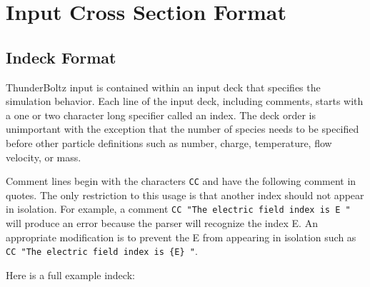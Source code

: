 \documentclass[letterpaper,10pt,english,openany,oneside]{sphinxmanual}
\begin{document}
\chapter{Input Cross Section Format}

\section{Indeck Format}

ThunderBoltz input is contained within an input deck that specifies the simulation
behavior. Each line of the input deck, including comments, starts with a one or two
character long specifier called an index. The deck order is unimportant with the
exception that the number of species needs to be specified before other particle
definitions such as number, charge, temperature, flow velocity, or mass.

Comment lines begin with the characters \texttt{CC} and have the following comment in
quotes. The only restriction to this usage is that another index should not appear in
isolation. For example, a comment \texttt{CC "The electric field index is E "} will
produce an error because the parser will recognize the index E. An appropriate
modification is to prevent the E from appearing in isolation such as \texttt{CC "The
electric field index is \{E\} "}.

Here is a full example indeck:
\end{document}
